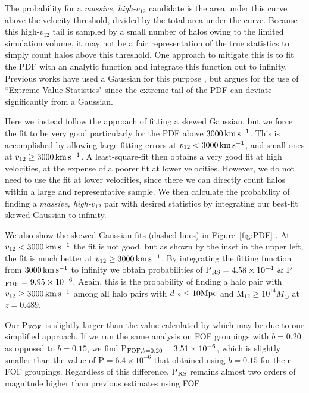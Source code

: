 \documentclass[useAMS, usenatbib]{mn2e}
\newcommand{\Msun}{M_{\odot}}
\newcommand{\vonetwo}{v_{12}}
\newcommand{\kms}{\,\rm{km}\,\rm{s}^{-1}}
\begin{document}
The probability for a {\it massive, high-$\vonetwo$} candidate is the area under this
curve above the velocity threshold, divided by the total area under
the curve.  Because this high-$\vonetwo$ tail is sampled by a small
number of halos owing to the limited simulation volume, it may not
be a fair representation of the true statistics to simply count
halos above this threshold.  One approach to mitigate this is to
fit the PDF with an analytic function and integrate this function
out to infinity.  Previous works have used a Gaussian for this
purpose \citep{Lee10,Thompson12}, but \citet{Bouillot14} argues for
the use of ``Extreme Value Statistics"
\citep{Frechet27,Fisher28,Gumbel35,Gnedenko43} since the extreme
tail of the PDF can deviate significantly from a Gaussian.

Here we instead follow the approach of fitting a skewed Gaussian,
but we force the fit to be very good particularly for the PDF above
$3000\kms$.  This is accomplished by allowing large fitting errors
at $\vonetwo<3000\kms$, and small ones at $\vonetwo\geq3000\kms$.
A least-square-fit then obtains a very good fit at high velocities,
at the expense of a poorer fit at lower velocities.  However, we
do not need to use the fit at lower velocities, since there we can
directly count halos within a large and representative sample.
We then calculate the probability of finding a {\it massive, high-$\vonetwo$} pair
with desired statistics by integrating our best-fit skewed Gaussian
to infinity.  

We also show the skewed Gaussian fits (dashed lines) in Figure~\ref{fig:PDF} .  
At $\vonetwo<3000\kms$ the fit is not good, but as shown by the inset
in the upper left, the fit is much better at $\vonetwo\geq3000\kms$.  
By integrating the fitting function from $3000\kms$ to infinity we obtain
probabilities of P$_{\rm{RS}}=4.58\times10^{-4}$ \&
P$_{\rm{FOF}}=9.95\times10^{-6}$.  Again, this is the probability
of finding a halo pair with $\vonetwo\geq3000\kms$ among all halo pairs with 
$d_{12}\leq10\rm{Mpc}$ and M$_{12}\geq10^{14}\Msun$
at $z=0.489$.

Our P$_{\rm{FOF}}$ is slightly larger than the value calculated by
\citet{Bouillot14} which may be due to our simplified approach.  If
we run the same analysis on FOF groupings with $b=0.20$ as opposed
to $b=0.15$, we find P$_{{\rm FOF},b=0.20}=3.51\times10^{-6}$, which
is slightly smaller than the value of P$=6.4\times10^{-6}$ that
\citet{Bouillot14} obtained using $b=0.15$ for their FOF groupings.
Regardless of this difference, P$_{\rm{RS}}$ remains almost two
orders of magnitude higher than previous estimates using FOF.
\end{document}
